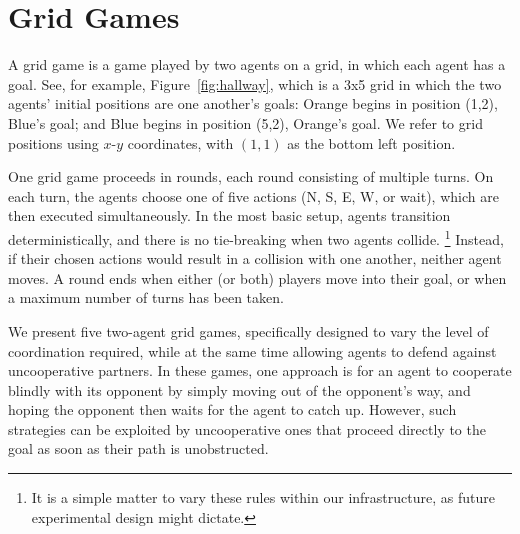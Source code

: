 
\section{Grid Games}
\label{sec:grid_games}

A grid game is a game played by two agents on a grid, in which each
agent has a goal.  See, for example, Figure~\ref{fig:hallway}, which
is a 3x5 grid in which the two agents' initial positions are one
another's goals: Orange begins in position (1,2), Blue's goal; and
Blue begins in position (5,2), Orange's goal.  We refer to grid
positions using $x$-$y$ coordinates, with $(1,1)$ as the bottom left
position.

One grid game proceeds in rounds,
each round consisting of multiple turns.
On each turn, the agents choose one of five actions (N, S, E, W, or wait),
which are then executed simultaneously.  In the most basic setup,
agents transition deterministically, and there is no tie-breaking when
two agents collide.%
\footnote{It is a simple matter to vary these rules within our
  infrastructure, as future experimental design might dictate.}
%
Instead, if their chosen actions would result in a collision with one
another, neither agent moves.  A round ends when either (or both)
players move into their goal, or when a maximum number of turns has
been taken.

We present five two-agent grid games, specifically designed to
vary the level of coordination required, while at the same time allowing agents to defend against uncooperative partners.
%
% 
In these games, one approach is for an agent to cooperate blindly with
its opponent by simply moving out of the opponent's way, and hoping
the opponent then waits for the agent to catch up.  However, such
strategies can be exploited by uncooperative ones that proceed
directly to the goal as soon as their path is unobstructed.
 
